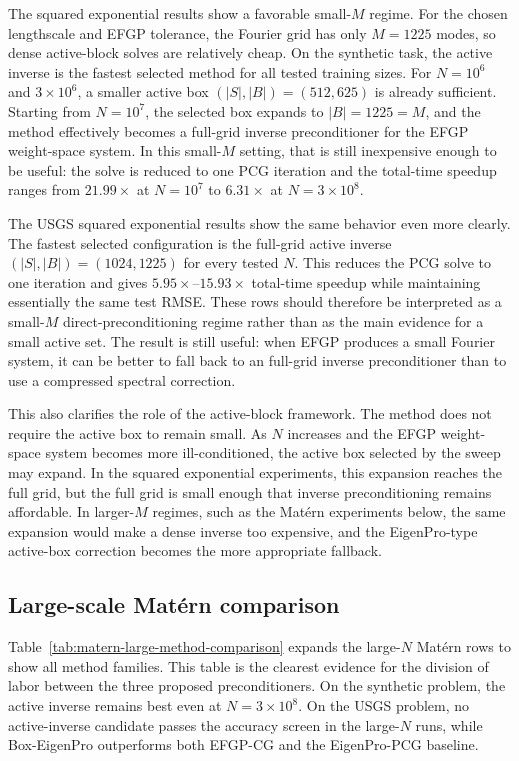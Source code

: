 The squared exponential results show a favorable small-\(M\) regime. For the
chosen lengthscale and EFGP tolerance, the Fourier grid has only \(M=1225\)
modes, so dense active-block solves are relatively cheap. On the synthetic
task, the active inverse is the fastest selected method for all tested training
sizes. For \(N=10^6\) and \(3\times10^6\), a smaller active box
\((|S|,|B|)=(512,625)\) is already sufficient. Starting from \(N=10^7\), the
selected box expands to \(|B|=1225=M\), and the method effectively becomes a
full-grid inverse preconditioner for the EFGP weight-space system. In this
small-\(M\) setting, that is still inexpensive enough to be useful: the solve is
reduced to one PCG iteration and the total-time speedup ranges from
\(21.99\times\) at \(N=10^7\) to \(6.31\times\) at \(N=3\times10^8\).

The USGS squared exponential results show the same behavior even more clearly.
The fastest selected configuration is the full-grid active inverse
\((|S|,|B|)=(1024,1225)\) for every tested \(N\). This reduces the PCG solve to
one iteration and gives \(5.95\times\)--\(15.93\times\) total-time speedup while
maintaining essentially the same test RMSE. These rows should therefore be
interpreted as a small-\(M\) direct-preconditioning regime rather than as the
main evidence for a small active set. The result is still useful: when EFGP
produces a small Fourier system, it can be better to fall back to an
 full-grid inverse preconditioner than to use a compressed spectral correction.

This also clarifies the role of the active-block framework. The method does not
require the active box to remain small. As \(N\) increases and the EFGP
weight-space system becomes more ill-conditioned, the active box selected by
the sweep may expand. In the squared exponential experiments, this expansion
reaches the full grid, but the full grid is small enough that inverse
preconditioning remains affordable. In larger-\(M\) regimes, such as the
Mat\'ern experiments below, the same expansion would make a dense inverse too
expensive, and the EigenPro-type active-box correction becomes the more
appropriate fallback.

\subsection{Large-scale Mat\'ern comparison}
\label{subsec:large-matern-comparison}

Table~\ref{tab:matern-large-method-comparison} expands the large-\(N\)
Mat\'ern rows to show all method families. This table is the clearest evidence for the division of labor between the three proposed preconditioners. On the synthetic problem, the active inverse remains best even at \(N=3\times10^8\). On the USGS problem, no active-inverse candidate passes the accuracy screen in the large-\(N\) runs, while Box-EigenPro outperforms both EFGP-CG and the EigenPro-PCG baseline.

